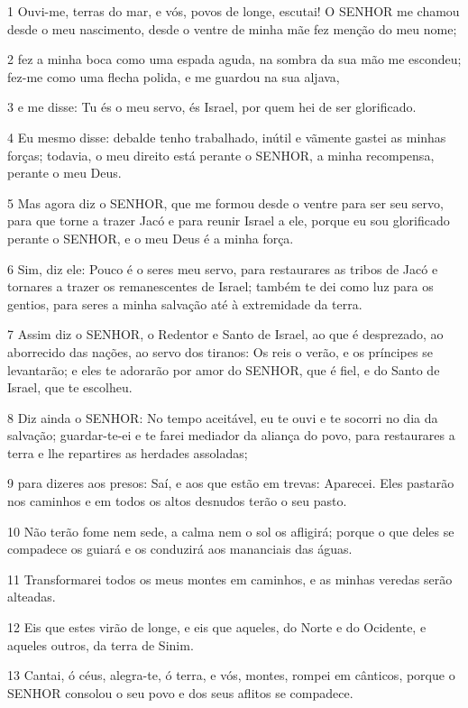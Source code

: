 \par 1 Ouvi-me, terras do mar, e vós, povos de longe, escutai! O SENHOR me chamou desde o meu nascimento, desde o ventre de minha mãe fez menção do meu nome;
\par 2 fez a minha boca como uma espada aguda, na sombra da sua mão me escondeu; fez-me como uma flecha polida, e me guardou na sua aljava,
\par 3 e me disse: Tu és o meu servo, és Israel, por quem hei de ser glorificado.
\par 4 Eu mesmo disse: debalde tenho trabalhado, inútil e vãmente gastei as minhas forças; todavia, o meu direito está perante o SENHOR, a minha recompensa, perante o meu Deus.
\par 5 Mas agora diz o SENHOR, que me formou desde o ventre para ser seu servo, para que torne a trazer Jacó e para reunir Israel a ele, porque eu sou glorificado perante o SENHOR, e o meu Deus é a minha força.
\par 6 Sim, diz ele: Pouco é o seres meu servo, para restaurares as tribos de Jacó e tornares a trazer os remanescentes de Israel; também te dei como luz para os gentios, para seres a minha salvação até à extremidade da terra.
\par 7 Assim diz o SENHOR, o Redentor e Santo de Israel, ao que é desprezado, ao aborrecido das nações, ao servo dos tiranos: Os reis o verão, e os príncipes se levantarão; e eles te adorarão por amor do SENHOR, que é fiel, e do Santo de Israel, que te escolheu.
\par 8 Diz ainda o SENHOR: No tempo aceitável, eu te ouvi e te socorri no dia da salvação; guardar-te-ei e te farei mediador da aliança do povo, para restaurares a terra e lhe repartires as herdades assoladas;
\par 9 para dizeres aos presos: Saí, e aos que estão em trevas: Aparecei. Eles pastarão nos caminhos e em todos os altos desnudos terão o seu pasto.
\par 10 Não terão fome nem sede, a calma nem o sol os afligirá; porque o que deles se compadece os guiará e os conduzirá aos mananciais das águas.
\par 11 Transformarei todos os meus montes em caminhos, e as minhas veredas serão alteadas.
\par 12 Eis que estes virão de longe, e eis que aqueles, do Norte e do Ocidente, e aqueles outros, da terra de Sinim.
\par 13 Cantai, ó céus, alegra-te, ó terra, e vós, montes, rompei em cânticos, porque o SENHOR consolou o seu povo e dos seus aflitos se compadece.
